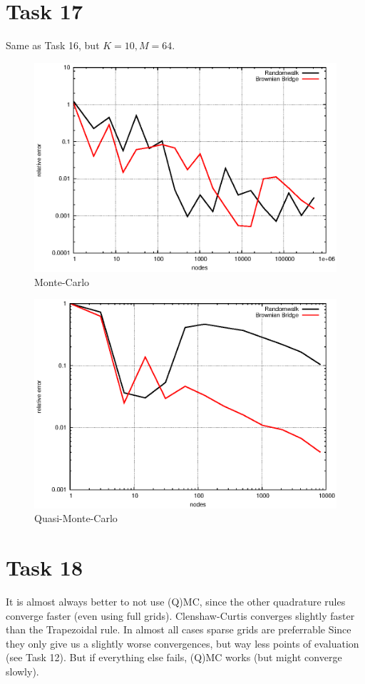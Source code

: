 \documentclass[]{article}
\begin{document}
\section*{Task 17}
Same as Task 16, but $K=10,M=64$.
\begin{figure}[!ht]
\centering
\includegraphics{task17_mc}
\caption{Monte-Carlo}
\label{fig:Task17a}
\end{figure}

\begin{figure}[!ht]
\centering
\includegraphics{task17_qmc}
\caption{Quasi-Monte-Carlo}
\label{fig:Task17b}
\end{figure}
\clearpage



\section*{Task 18} It is almost always better to not use (Q)MC, since the other
quadrature rules converge faster (even using full grids). Clenshaw-Curtis
converges slightly faster than the Trapezoidal rule. In almost all cases sparse
grids are preferrable Since they only give us a slightly worse convergences, but
way less points of evaluation (see Task 12). But if everything else fails, (Q)MC
works (but might converge slowly).
\end{document}

